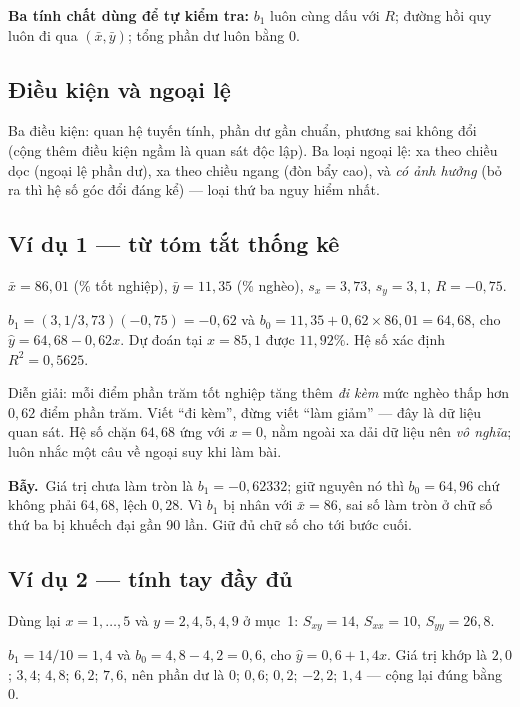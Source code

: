 \documentclass[11pt]{article}
\newcommand{\bay}{\textbf{Bẫy.}\ }
\begin{document}
\textbf{Ba tính chất dùng để tự kiểm tra:} $b_1$ luôn cùng dấu với $R$; đường hồi
quy luôn đi qua $(\bar x, \bar y)$; tổng phần dư luôn bằng 0.

\subsection*{Điều kiện và ngoại lệ}

Ba điều kiện: quan hệ tuyến tính, phần dư gần chuẩn, phương sai không đổi (cộng
thêm điều kiện ngầm là quan sát độc lập). Ba loại ngoại lệ: xa theo chiều dọc
(ngoại lệ phần dư), xa theo chiều ngang (đòn bẩy cao), và \emph{có ảnh hưởng}
(bỏ ra thì hệ số góc đổi đáng kể) --- loại thứ ba nguy hiểm nhất.

\subsection*{Ví dụ 1 --- từ tóm tắt thống kê}

$\bar x = 86{,}01$ (\% tốt nghiệp), $\bar y = 11{,}35$ (\% nghèo), $s_x = 3{,}73$,
$s_y = 3{,}1$, $R = -0{,}75$.

$b_1 = (3{,}1/3{,}73)(-0{,}75) = -0{,}62$ và
$b_0 = 11{,}35 + 0{,}62 \times 86{,}01 = 64{,}68$, cho $\hat y = 64{,}68 - 0{,}62x$.
Dự đoán tại $x = 85{,}1$ được $11{,}92\%$. Hệ số xác định $R^2 = 0{,}5625$.

Diễn giải: mỗi điểm phần trăm tốt nghiệp tăng thêm \emph{đi kèm} mức nghèo thấp
hơn $0{,}62$ điểm phần trăm. Viết ``đi kèm'', đừng viết ``làm giảm'' --- đây là dữ
liệu quan sát. Hệ số chặn $64{,}68$ ứng với $x=0$, nằm ngoài xa dải dữ liệu nên
\emph{vô nghĩa}; luôn nhắc một câu về ngoại suy khi làm bài.

\bay Giá trị chưa làm tròn là $b_1 = -0{,}62332$; giữ nguyên nó thì $b_0 = 64{,}96$
chứ không phải $64{,}68$, lệch $0{,}28$. Vì $b_1$ bị nhân với $\bar x = 86$, sai số
làm tròn ở chữ số thứ ba bị khuếch đại gần 90 lần. Giữ đủ chữ số cho tới bước cuối.

\subsection*{Ví dụ 2 --- tính tay đầy đủ}

Dùng lại $x = 1,\dots,5$ và $y = 2,4,5,4,9$ ở mục~1: $S_{xy}=14$, $S_{xx}=10$,
$S_{yy}=26{,}8$.

$b_1 = 14/10 = 1{,}4$ và $b_0 = 4{,}8 - 4{,}2 = 0{,}6$, cho $\hat y = 0{,}6+1{,}4x$.
Giá trị khớp là $2{,}0$; $3{,}4$; $4{,}8$; $6{,}2$; $7{,}6$, nên phần dư là
$0$; $0{,}6$; $0{,}2$; $-2{,}2$; $1{,}4$ --- cộng lại đúng bằng 0.
\end{document}
